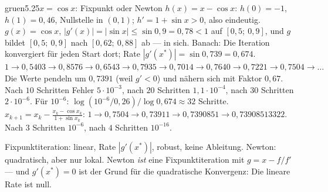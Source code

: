 \begin{loesungkarte}{gruen}{5.25}{$x = \cos x$: Fixpunkt oder Newton}
$h(x) = x - \cos x$: $h(0) = -1$, $h(1) = 0{,}46$, Nullstelle in $(0, 1)$; $h' = 1 + \sin x > 0$, also eindeutig.
$g(x) = \cos x$, $|g'(x)| = |\sin x|\le\sin0{,}9 = 0{,}78 < 1$ auf $[0{,}5;\ 0{,}9]$, und $g$ bildet $[0{,}5;\ 0{,}9]$ nach $[0{,}62;\ 0{,}88]$ ab --- in sich. Banach: Die Iteration konvergiert für jeden Start dort; Rate $|g'(x^{*})| = \sin0{,}739 = 0{,}674$.
$1\to0{,}5403\to0{,}8576\to0{,}6543\to0{,}7935\to0{,}7014\to0{,}7640\to0{,}7221\to0{,}7504\to\dots$ Die Werte pendeln um $0{,}7391$ (weil $g' < 0$) und nähern sich mit Faktor $0{,}67$. Nach $10$ Schritten Fehler $5\cdot10^{-3}$, nach $20$ Schritten $1{,}1\cdot10^{-4}$, nach $30$ Schritten $2\cdot10^{-6}$. Für $10^{-6}$: $\log(10^{-6}/0{,}26)/\log0{,}674\approx32$ Schritte.
$x_{k+1} = x_k - \frac{x_k - \cos x_k}{1 + \sin x_k}$: $1\to0{,}7504\to0{,}73911\to0{,}7390851\to0{,}73908513322$. Nach $3$ Schritten $10^{-6}$, nach $4$ Schritten $10^{-16}$.
\begin{mitnehmen}\kastentext
Fixpunktiteration: linear, Rate $|g'(x^{*})|$, robust, keine Ableitung. Newton: quadratisch, aber nur lokal. Newton \emph{ist} eine Fixpunktiteration mit $g = x - f/f'$ --- und $g'(x^{*}) = 0$ ist der Grund für die quadratische Konvergenz: Die lineare Rate ist null.
\end{mitnehmen}
\end{loesungkarte}


